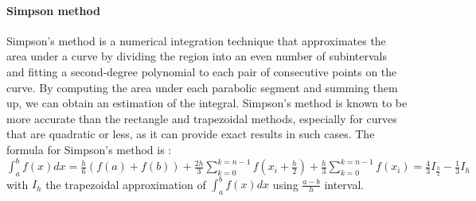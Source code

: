 \paragraph{Simpson method}
Simpson's method is a numerical integration technique that approximates the area under a curve by dividing the region into an even number of subintervals and fitting a second-degree polynomial to each pair of consecutive points on the curve. By computing the area under each parabolic segment and summing them up, we can obtain an estimation of the integral. Simpson's method is known to be more accurate than the rectangle and trapezoidal methods, especially for curves that are quadratic or less, as it can provide exact results in such cases. The formula for Simpson's method is : \\
$\int_{a}^{b}f(x)dx = \frac{h}{6}(f(a)+f(b)) +\frac{2h}{3}\sum_{k=0}^{k=n-1}f(x_{i} +\frac{h}{2})  + \frac{h}{3}\sum_{k=0}^{k=n-1} f(x_{i}) = \frac{4}{3}I_{\frac{h}{2}} - \frac{1}{3}I_{h} $ \\
with $I_{h}$ the trapezoidal approximation of $\int_{a}^{b}f(x)dx $ using $\frac{a-b}{h}$ interval.

